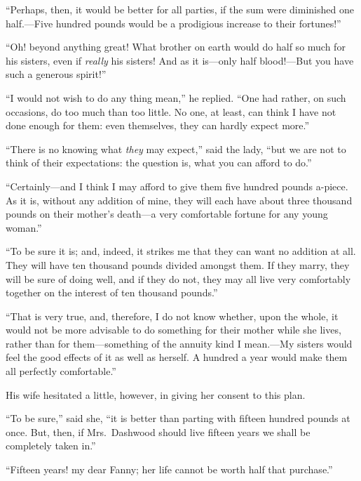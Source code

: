 ``Perhaps, then, it would be better for all parties,
if the sum were diminished one half.---Five hundred pounds
would be a prodigious increase to their fortunes!''

``Oh! beyond anything great!  What brother on earth
would do half so much for his sisters, even if \emph{really}
his sisters!  And as it is---only half blood!---But you
have such a generous spirit!''

``I would not wish to do any thing mean,'' he replied.
``One had rather, on such occasions, do too much than
too little.  No one, at least, can think I have not
done enough for them: even themselves, they can hardly
expect more.''

``There is no knowing what \emph{they} may expect,''
said the lady, ``but we are not to think of their
expectations: the question is, what you can afford to do.''

``Certainly---and I think I may afford to give them five
hundred pounds a-piece.  As it is, without any addition
of mine, they will each have about three thousand pounds
on their mother's death---a very comfortable fortune
for any young woman.''

``To be sure it is; and, indeed, it strikes me that
they can want no addition at all.  They will have ten
thousand pounds divided amongst them.  If they marry,
they will be sure of doing well, and if they do not,
they may all live very comfortably together on the interest
of ten thousand pounds.''

``That is very true, and, therefore, I do not know whether,
upon the whole, it would not be more advisable to do
something for their mother while she lives, rather than
for them---something of the annuity kind I mean.---My sisters
would feel the good effects of it as well as herself.
A hundred a year would make them all perfectly comfortable.''

His wife hesitated a little, however, in giving
her consent to this plan.

``To be sure,'' said she, ``it is better than parting with
fifteen hundred pounds at once.  But, then, if Mrs.\ Dashwood
should live fifteen years we shall be completely taken in.''

``Fifteen years! my dear Fanny; her life cannot
be worth half that purchase.''

